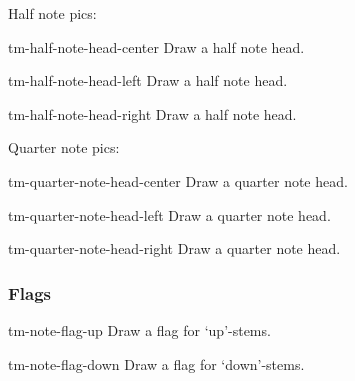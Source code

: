 Half note pics:
\begin{pictype}{tm-half-note-head-center}{}
  Draw a half note head.
\end{pictype}
\begin{pictype}{tm-half-note-head-left}{}
  Draw a half note head.
\end{pictype}
\begin{pictype}{tm-half-note-head-right}{}
  Draw a half note head.
\end{pictype}
\begin{codeexample}[]
\end{codeexample}

Quarter note pics:
\begin{pictype}{tm-quarter-note-head-center}{}
  Draw a quarter note head.
\end{pictype}
\begin{pictype}{tm-quarter-note-head-left}{}
  Draw a quarter note head.
\end{pictype}
\begin{pictype}{tm-quarter-note-head-right}{}
  Draw a quarter note head.
\end{pictype}
\begin{codeexample}[]
\end{codeexample}
\subsubsection{Flags}\label{sec:out:pic:flags}
\begin{pictype}{tm-note-flag-up}{}
  Draw a flag for `up'-stems.
\end{pictype}
\begin{pictype}{tm-note-flag-down}{}
  Draw a flag for `down'-stems.
\end{pictype}
\begin{codeexample}[]
\end{codeexample}
